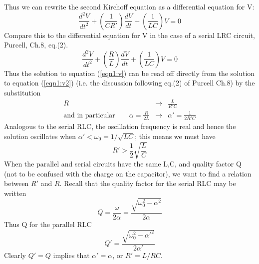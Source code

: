 \documentclass[makesolutionspdf]{esg8022pset}
\begin{document}
\begin{solution}
Thus we can rewrite the second Kirchoff equation as a differential
equation for V:
\begin{equation}\label{eqn1:v}
\frac{d^2V}{dt^2}+\left(\frac{1}{CR'}\right)\frac{dV}{dt}+\left(\frac{1}{LC}\right)V=0
\end{equation}
Compare this to the differential equation for V in the case of a
serial LRC circuit, Purcell, Ch.8, eq.(2).
\begin{equation}\label{eqn1:v2}
\frac{d^2V}{dt^2}+\left(\frac{R}{L}\right)\frac{dV}{dt}+\left(\frac{1}{LC}\right)V=0
\end{equation}
Thus the solution to equation (\ref{eqn1:v}) can be read off directly
from the solution to equation (\ref{eqn1:v2}) (i.e. the discussion
following eq.(2) of Purcell Ch.8) by the substitution
\begin{eqnarray}
R &\rightarrow & \frac{L}{R'C}\\ \textrm{and in particular}\qquad
\alpha=\frac{R}{2L} &\rightarrow & \alpha'=\frac{1}{2R'C}
\end{eqnarray}
Analogous to the serial RLC, the oscillation frequency is real and hence
the solution oscillates when $\alpha'<\omega_0=1/\sqrt{LC}$; this
means we must have
\begin{equation}
R'>\frac{1}{2}\sqrt{\frac{L}{C}}
\end{equation}
When the parallel and serial circuits have the same L,C, and quality
factor Q (not to be confused with the charge on the capacitor), we
want to find a relation between $R'$ and $R$.  Recall that the quality
factor for the serial RLC may be written
\begin{equation}
Q=\frac{\omega}{2\alpha}=\frac{\sqrt{\omega_0^2-\alpha^2}}{2\alpha}
\end{equation}
Thus Q for the parallel RLC
\begin{equation}
Q'=\frac{\sqrt{\omega_0^2-\alpha'^2}}{2\alpha'}
\end{equation}
Clearly $Q'=Q$ implies that $\alpha'=\alpha$, or $R'=L/RC$.

\end{solution}
\end{document}
